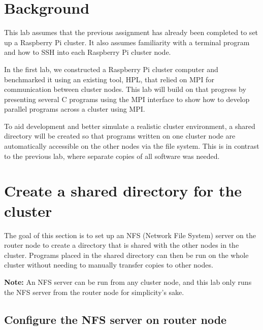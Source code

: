 \documentclass{article}
\begin{document}
\section{Background}

This lab assumes that the previous assignment has already been completed to set up a Raspberry Pi cluster. It also assumes familiarity with a terminal program and how to SSH into each Raspberry Pi cluster node.

In the first lab, we constructed a Raspberry Pi cluster computer and benchmarked it using an existing tool, HPL, that relied on MPI for communication between cluster nodes. This lab will build on that progress by presenting several C programs using the MPI interface to show how to develop parallel programs across a cluster using MPI.

To aid development and better simulate a realistic cluster environment, a shared directory will be created so that programs written on one cluster node are automatically accessible on the other nodes via the file system. This is in contrast to the previous lab, where separate copies of all software was needed.

\section{Create a shared directory for the cluster}
\label{section/shared-directory}
The goal of this section is to set up an NFS (Network File System) server on the router node to create a directory that is shared with the other nodes in the cluster. Programs placed in the shared directory can then be run on the whole cluster without needing to manually transfer copies to other nodes. 

\textbf{Note:} An NFS server can be run from any cluster node, and this lab only runs the NFS server from the router node for simplicity's sake.

\subsection{Configure the NFS server on router node}
\label{install-nfs-server}
\end{document}

